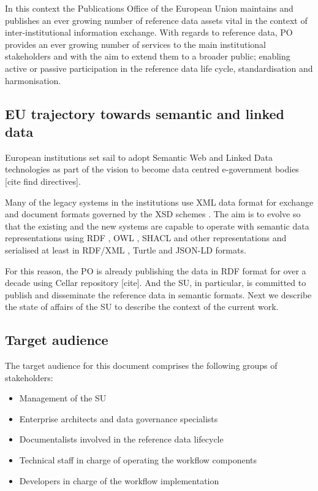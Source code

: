 	In this context the Publications Office of the European Union maintains and publishes an ever growing number of reference data assets vital in the context of inter-institutional information exchange. With regards to reference data, PO provides an ever growing number of services to the main institutional stakeholders and with the aim to extend them to a broader public; enabling active or passive participation in the reference data life cycle, standardisation and harmonisation.

	\subsection{EU trajectory towards semantic and linked data}
	
	European institutions set sail to adopt Semantic Web and Linked Data technologies as part of the vision to become data centred e-government bodies [cite find directives]. 
	
	Many of the legacy systems in the institutions use XML data format for exchange and document formats governed by the XSD schemes \citep{xsd1.1-spec}. The aim is to evolve so that the existing and the new systems are capable to operate with semantic data representations using RDF \citep{rdf11}, OWL \citep{owl2.0,owl2}, SHACL \citep{shacl-spec} and other representations and serialised at least in RDF/XML \citep{rdf-xml-Beckett:04:RSS,rdf-xml-Schreiber:14:RXS}, Turtle \citep{turtle-Carothers:14:RT} and JSON-LD \citep{spornyjson,sporny2014json} formats.
	
	For this reason, the PO is already publishing the data in RDF format for over a decade using Cellar repository [cite]. And the SU, in particular, is committed to publish and disseminate the reference data in semantic formats. Next we describe the state of affairs of the SU to describe the context of the current work. 
	
	\subsection{Target audience}
	\label{sec:audience}
	The target audience for this document comprises the following groups of stakeholders:	

	\begin{itemize}
		\item Management of the SU
		\item Enterprise architects and data governance specialists
		\item Documentalists involved in the reference data lifecycle
		\item Technical staff in charge of operating the workflow components
		\item Developers in charge of the workflow implementation		
	\end{itemize}	
	

